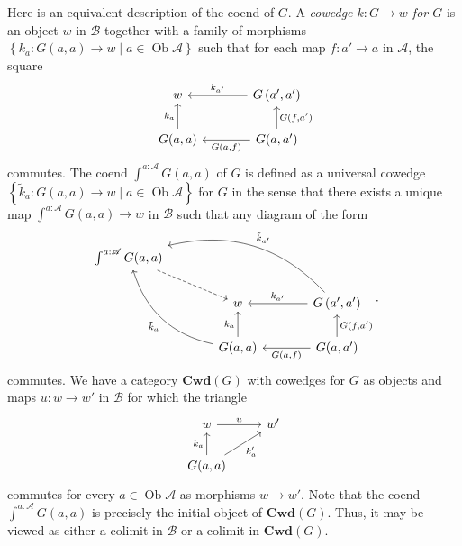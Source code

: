 \documentclass[10pt,letterpaper,cm]{nupset}
\theoremstyle{definition}
\theoremstyle{theorem}
\theoremstyle{remark}
\DeclareMathOperator{\ob}{Ob}
\newcommand{\0}{\mathbf{0}}
\newcommand{\1}{\mathbf{1}}
\newcommand{\2}{\mathbf{2}}
\renewcommand{\a}{\mathscr{A}}
\renewcommand{\b}{\mathscr{B}}
\begin{document}
Here is an equivalent description of the coend of $G$. A \textit{cowedge $k: G \to w$ for $G$} is an object $w$ in $\b$ together with a family of morphisms $\left\{k_a : G(a,a) \to w \mid a\in \ob{\a}\right\}$ such that for each map $f:a' \to a$ in $\a$, the square
\[
\begin{tikzcd}[column sep = large]
w                         & {G\left(a',a'\right)} \arrow[l, "k_{a'}"']                         \\
{G(a,a)} \arrow[u, "k_a"] & {G(a,a')} \arrow[l, "{G(a,f)}"] \arrow[u, "{G(f,a')}"']
\end{tikzcd}
\] commutes. The coend $\int^{a:\a}G(a,a)$ of $G$ is defined as a universal cowedge $\left\{\tilde{k}_a : G(a,a) \to w \mid a\in \ob{\a}\right\}$ for $G$ in the sense that there exists a unique map $ \int^{a:\a}G(a,a) \to w$ in $\b$ such that any diagram of the form
\[
\begin{tikzcd}[column sep=large]
{\int^{a:\a}G(a,a)} \arrow[rd, dashed] &                                                                 &                                                                            \\
                                       & w                                                               & {G\left(a',a'\right)} \arrow[l, "k_{a'}"'] \arrow[llu, "\tilde{k}_{a'}"', bend right] \\
                                       & {G(a,a)} \arrow[u, "k_a"] \arrow[luu, "\tilde{k}_a", bend left] & {G(a,a')} \arrow[u, "{G(f,a')}"'] \arrow[l, "{G(a,f)}"]                                  
\end{tikzcd}.
\]
commutes.
We have a category $\mathbf{Cwd}(G)$ with cowedges for $G$ as objects and maps $u: w \to w'$ in $\b$ for which the triangle
\[
\begin{tikzcd}
w \arrow[r, "u"]                              & w' \\
{G(a,a)} \arrow[u, "k_a"] \arrow[ru, "k'_a"'] &   
\end{tikzcd}
\] commutes for every $a\in \ob{\a}$ as morphisms $w\to w'$. Note that the coend $\int^{a:\a}G(a,a)$ is precisely the initial object of $\mathbf{Cwd}(G)$. Thus, it may be viewed as either a colimit in $\b$ or a colimit in $\mathbf{Cwd}(G)$.
\end{document}
